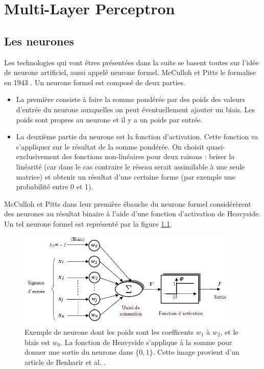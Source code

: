 \chapter{Multi-Layer Perceptron}

\section{Les neurones}

Les technologies qui vont êtres présentées dans la suite se basent toutes sur l'idée de neurone artificiel, aussi appelé neurone formel. McCulloh et Pitts le formalise en 1943 \cite{mcculloch_logical_1943}.
Un neurone formel est composé de deux parties.\begin{itemize}
\item La première consiste à faire la somme pondérée par des poids des valeurs d'entrée du neurone auxquelles on peut éventuellement ajouter un biais. Les poids sont propres au neurone et il y a un poids par entrée.
\item La deuxième partie du neurone est la fonction d'activation. Cette fonction va s'appliquer sur le résultat de la somme pondérée. On choisit quasi-exclusivement des fonctions non-linéaires pour deux raisons : briser la linéarité (car dans le cas contraire le réseau serait assimilable à une seule matrice) et obtenir un résultat d'une certaine forme (par exemple une probabilité entre 0 et 1).
\end{itemize}
McCulloh et Pitts dans leur première ébauche du neurone formel considérèrent des neurones au résultat binaire à l'aide d'une fonction d'activation de Heavyside. Un tel neurone formel est représenté par la figure \ref{neurone_exemple}.



\begin{figure}[!h]
\centering
\includegraphics[width=300pt,valign=t]{"images/MLP/neurone_exemple2"}
\caption{Exemple de neurone dont les poids sont les coefficents $w_1$ à $w_2$, et le biais est $w_0$. La fonction de Heavyside s'applique à la somme pour donner une sortie du neurone dans $\{0, 1\}$. Cette image provient d'un article de Benharir et al. \cite{benharir_approche_2014}.}
\label{neurone_exemple}
\end{figure}

